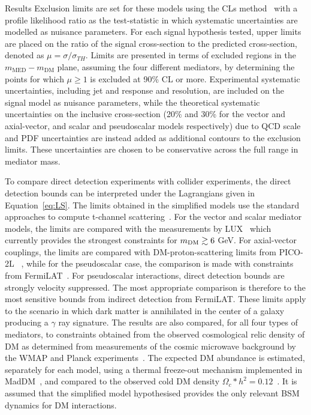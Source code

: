 \begin{section}{Results}
Exclusion limits are set for these models using the CLs method~\cite{cls} with a profile likelihood ratio as the 
test-statistic in which systematic uncertainties are modelled as nuisance parameters. 
For each signal hypothesis tested, upper limits are placed on the ratio of 
the signal cross-section to the predicted cross-section, denoted as $\mu=\sigma/\sigma_{TH}$. Limits are presented in terms of excluded regions in the 
$m_{\mathrm{MED}}-m_{\textrm{DM}}$ plane, assuming the four different mediators, by determining the points for which $\mu\ge1$ is excluded at 90\% CL or more.
Experimental systematic uncertainties, including jet and \ETm response and resolution, are included on the signal model as nuisance parameters, while the
theoretical systematic uncertainties on the inclusive cross-section (20\% and 30\% for the vector and axial-vector, and scalar and pseudoscalar models respectively) due to QCD scale and 
PDF uncertainties are instead added as additional contours to the exclusion limits. These uncertainties are chosen to be conservative across the full range in mediator mass.

To compare direct detection experiments with collider experiments, the direct detection bounds can be interpreted under the Lagrangians given in Equation~\ref{eq:LS}. The limits obtained in 
the simplified models use the standard approaches to compute t-channel scattering~\cite{Kurylov:2003ra,Hisano:2010ct, Cheung:2013pfa,Buchmueller:2014yoa}. 
For the vector and scalar mediator models, the limits are compared with the measurements by LUX~\cite{Akerib:2012ys,Akerib:2013tjd,Szydagis:2014xog} which currently 
provides the strongest constraints for $m_{\rm{DM}} \gtrsim 6$ GeV. For axial-vector couplings, the limits are compared with 
DM-proton-scattering limits from PICO-2L~\cite{Amole:2015lsj} , while for the pseudoscalar case, 
the comparison is made with constraints from FermiLAT~\cite{Ackermann:2011wa,Abdo:2010ex}.
For pseudoscalar interactions, direct detection bounds are strongly velocity suppressed. 
The most appropriate comparison is therefore to the most sensitive bounds from indirect detection from FermiLAT. 
These limits apply to the scenario in which dark matter is annihilated in the center of a galaxy producing a $\gamma$ ray signature. 
The results are also compared, for all four types of mediators, to constraints obtained from the observed cosmological relic density of DM as determined from 
measurements of the cosmic microwave background by the WMAP and Planck experiments~\cite{Bennett:2003ba,Planck:2006aa}. The expected DM abundance is estimated, separately for each
model, using a thermal freeze-out mechanism implemented in MadDM~\cite{Backovic:2013dpa}, and compared to the observed cold DM density $\Omega_c*h^2=0.12$~\cite{Ade:2013zuv}. 
It is assumed that the simplified model hypothesised provides the only relevant BSM dynamics for DM interactions.


\end{section}
